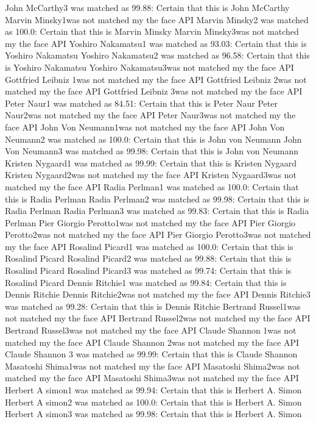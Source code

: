 \documentclass[12pt,a4paper]{article}
\begin{document}
\begin{appendices}
John McCarthy3 was matched as 99.88: Certain that this is John McCarthy
Marvin Minsky1was not matched my the face API
Marvin Minsky2 was matched as 100.0: Certain that this is Marvin Minsky
Marvin Minsky3was not matched my the face API
Yoshiro Nakamatsu1 was matched as 93.03: Certain that this is Yoshiro Nakamatsu
Yoshiro Nakamatsu2 was matched as 96.58: Certain that this is Yoshiro Nakamatsu
Yoshiro Nakamatsu3was not matched my the face API
Gottfried Leibniz 1was not matched my the face API
Gottfried Leibniz 2was not matched my the face API
Gottfried Leibniz 3was not matched my the face API
Peter Naur1 was matched as 84.51: Certain that this is Peter Naur
Peter Naur2was not matched my the face API
Peter Naur3was not matched my the face API
John Von Neumann1was not matched my the face API
John Von Neumann2 was matched as 100.0: Certain that this is John von Neumann
John Von Neumann3 was matched as 99.98: Certain that this is John von Neumann
Kristen Nygaard1 was matched as 99.99: Certain that this is Kristen Nygaard
Kristen Nygaard2was not matched my the face API
Kristen Nygaard3was not matched my the face API
Radia Perlman1 was matched as 100.0: Certain that this is Radia Perlman
Radia Perlman2 was matched as 99.98: Certain that this is Radia Perlman
Radia Perlman3 was matched as 99.83: Certain that this is Radia Perlman
Pier Giorgio Perotto1was not matched my the face API
Pier Giorgio Perotto2was not matched my the face API
Pier Giorgio Perotto3was not matched my the face API
Rosalind Picard1 was matched as 100.0: Certain that this is Rosalind Picard
Rosalind Picard2 was matched as 99.88: Certain that this is Rosalind Picard
Rosalind Picard3 was matched as 99.74: Certain that this is Rosalind Picard
Dennis Ritchie1 was matched as 99.84: Certain that this is Dennis Ritchie
Dennis Ritchie2was not matched my the face API
Dennis Ritchie3 was matched as 99.28: Certain that this is Dennis Ritchie
Bertrand Russel1was not matched my the face API
Bertrand Russel2was not matched my the face API
Bertrand Russel3was not matched my the face API
Claude Shannon 1was not matched my the face API
Claude Shannon 2was not matched my the face API
Claude Shannon 3 was matched as 99.99: Certain that this is Claude Shannon
Masatoshi Shima1was not matched my the face API
Masatoshi Shima2was not matched my the face API
Masatoshi Shima3was not matched my the face API
Herbert A simon1 was matched as 99.94: Certain that this is Herbert A. Simon
Herbert A simon2 was matched as 100.0: Certain that this is Herbert A. Simon
Herbert A simon3 was matched as 99.98: Certain that this is Herbert A. Simon

\end{appendices}
\end{document}
